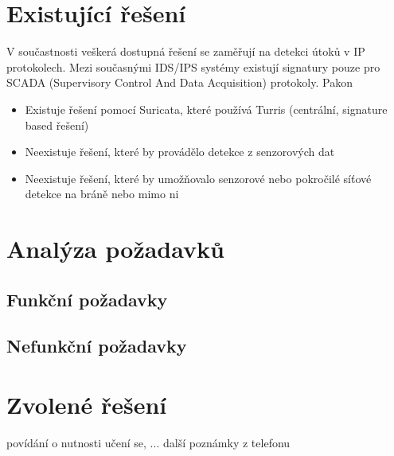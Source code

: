  \section{Existující řešení}
 V součastnosti veškerá dostupná řešení se zaměřují na detekci útoků v IP protokolech. Mezi 
 současnými IDS/IPS systémy existují signatury pouze pro SCADA (Supervisory Control And Data Acquisition)
 protokoly. Pakon
 
 
 
  \begin{itemize}
 \item Existuje řešení pomocí Suricata, které používá Turris (centrální, signature
 based řešení)
 \item Neexistuje řešení, které by provádělo detekce z senzorových dat
 \item Neexistuje řešení, které by umožňovalo senzorové nebo pokročilé síťové
 detekce na bráně nebo mimo ni
\end{itemize}
 \section{Analýza požadavků}
 
  \subsection{Funkční požadavky}
  \subsection{Nefunkční požadavky}
 
 \section{Zvolené řešení}
 povídání o nutnosti učení se, ... další poznámky z telefonu
